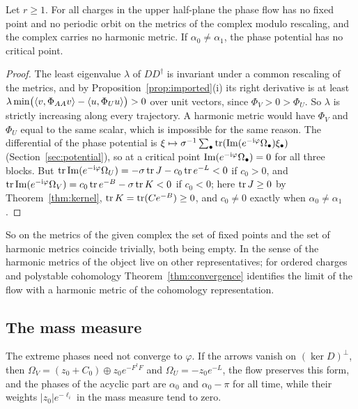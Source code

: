 \begin{proposition}\label{prop:fixed}
Let $r\geq1$. For all charges in the upper half-plane the phase flow has no
fixed point and no periodic orbit on the metrics of the complex modulo
rescaling, and the complex carries no harmonic metric. If
$\alpha_0\neq\alpha_1$, the phase potential has no critical point.
\end{proposition}

\begin{proof}
The least eigenvalue $\lambda$ of $DD^\dagger$ is invariant under a common
rescaling of the metrics, and by Proposition~\ref{prop:imported}(i) its right
derivative is at least
$\lambda\min\bigl(\left\langle v,\Phi_{AA}v\right\rangle-\left\langle u,\Phi_Uu\right\rangle\bigr)>0$ over unit
vectors, since $\Phi_V>0>\Phi_U$. So $\lambda$ is strictly increasing along
every trajectory. A harmonic metric would have $\Phi_V$ and $\Phi_U$ equal to
the same scalar, which is impossible for the same reason. The differential
of the phase potential is
$\xi\mapsto\sigma^{-1}\sum_\bullet\operatorname{tr}(\operatorname{Im}(e^{-\mathrm i\varphi}\Omega_\bullet)\xi_\bullet)$
(Section~\ref{sec:potential}), so at a critical point
$\operatorname{Im}(e^{-\mathrm i\varphi}\Omega_\bullet)=0$ for all three blocks. But
$\operatorname{tr}\operatorname{Im}(e^{-\mathrm i\varphi}\Omega_U)=-\sigma\operatorname{tr} J-c_0\operatorname{tr} e^{-L}<0$ if $c_0>0$, and
$\operatorname{tr}\operatorname{Im}(e^{-\mathrm i\varphi}\Omega_V)=c_0\operatorname{tr} e^{-B}-\sigma\operatorname{tr} K<0$ if $c_0<0$; here
$\operatorname{tr} J\geq0$ by Theorem~\ref{thm:kernel}, $\operatorname{tr} K=\operatorname{tr}(Ce^{-B})\geq0$, and
$c_0\neq0$ exactly when $\alpha_0\neq\alpha_1$.
\end{proof}

So on the metrics of the given complex the set of fixed points and the set
of harmonic metrics coincide trivially, both being empty. In the sense of
\cite[Remark~5.15]{hkkp26} the harmonic metrics of the object live on other
representatives; for ordered charges and polystable cohomology
Theorem~\ref{thm:convergence} identifies the limit of the flow with a
harmonic metric of the cohomology representation.

\subsection{The mass measure}
The extreme phases need not converge to $\varphi$. If the arrows vanish on
$(\ker D)^\perp$, then $\Omega_V=(z_0+C_0)\oplus z_0e^{-F^\dagger F}$ and
$\Omega_U=-z_0e^{-L}$, the flow preserves this form, and the phases of the
acyclic part are $\alpha_0$ and $\alpha_0-\pi$ for all time, while their
weights $|z_0|e^{-\ell_i}$ in the mass measure tend to zero.

